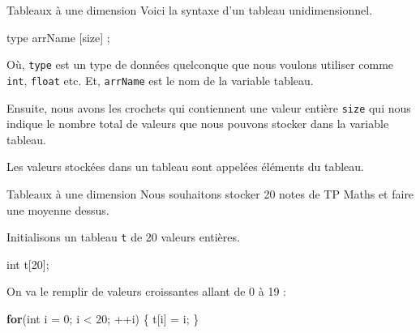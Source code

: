 \documentclass[
  10pt,
  french,
  ignorenonframetext,
  aspectratio=169,
]{beamer}
\newenvironment{Shaded}{}{}
\newcommand{\ControlFlowTok}[1]{\textcolor[rgb]{0.00,0.44,0.13}{\textbf{#1}}}
\newcommand{\DataTypeTok}[1]{\textcolor[rgb]{0.56,0.13,0.00}{#1}}
\newcommand{\DecValTok}[1]{\textcolor[rgb]{0.25,0.63,0.44}{#1}}
\newcommand{\NormalTok}[1]{#1}
\newcommand{\OperatorTok}[1]{\textcolor[rgb]{0.40,0.40,0.40}{#1}}
\begin{document}
\begin{frame}[fragile]{Tableaux à une dimension}
\protect\hypertarget{tableaux-uxe0-une-dimension}{}
Voici la syntaxe d'un tableau unidimensionnel.

\begin{Shaded}
\begin{Highlighting}[]
\NormalTok{type arrName }\OperatorTok{[}\NormalTok{size}\OperatorTok{]} \OperatorTok{;}
\end{Highlighting}
\end{Shaded}

Où, \texttt{type} est un type de données quelconque que nous voulons
utiliser comme \texttt{int}, \texttt{float} etc. Et, \texttt{arrName}
est le nom de la variable tableau.

Ensuite, nous avons les crochets qui contiennent une valeur entière
\texttt{size} qui nous indique le nombre total de valeurs que nous
pouvons stocker dans la variable tableau.

Les valeurs stockées dans un tableau sont appelées éléments du tableau.
\end{frame}

\begin{frame}[fragile]{Tableaux à une dimension}
\protect\hypertarget{tableaux-uxe0-une-dimension-1}{}
Nous souhaitons stocker 20 notes de TP Maths et faire une moyenne
dessus.

\begin{block}{Initialisons un tableau \texttt{t} de 20 valeurs
entières.}
\protect\hypertarget{initialisons-un-tableau-t-de-20-valeurs-entiuxe8res.}{}
\begin{Shaded}
\begin{Highlighting}[]
\DataTypeTok{int}\NormalTok{ t}\OperatorTok{[}\DecValTok{20}\OperatorTok{];}
\end{Highlighting}
\end{Shaded}

On va le remplir de valeurs croissantes allant de 0 à 19 :

\begin{Shaded}
\begin{Highlighting}[]
\ControlFlowTok{for}\OperatorTok{(}\DataTypeTok{int}\NormalTok{ i }\OperatorTok{=} \DecValTok{0}\OperatorTok{;}\NormalTok{ i }\OperatorTok{\textless{}} \DecValTok{20}\OperatorTok{;} \OperatorTok{++}\NormalTok{i}\OperatorTok{)} \OperatorTok{\{}
\NormalTok{    t}\OperatorTok{[}\NormalTok{i}\OperatorTok{]} \OperatorTok{=}\NormalTok{ i}\OperatorTok{;}
\OperatorTok{\}}
\end{Highlighting}
\end{Shaded}
\end{block}
\end{frame}
\end{document}

